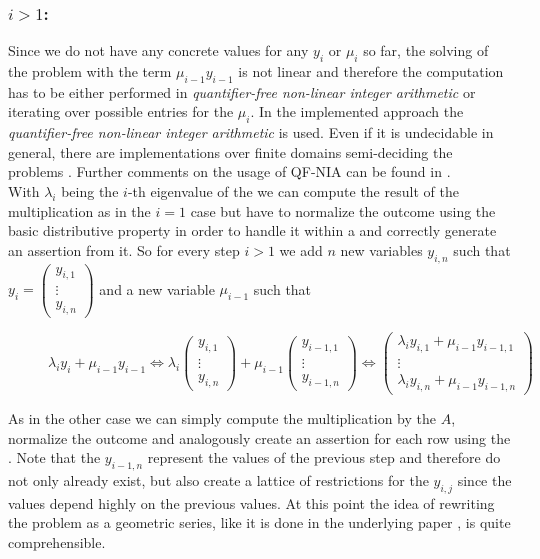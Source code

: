 \subsubsection{$i > 1$:}
Since we do not have any concrete values for any $y_i$ or $\mu_i$ so far, the solving of the problem with the term $\mu_{i-1}y_{i-1}$ is not linear and therefore the computation has to be either performed in \textit{quantifier-free non-linear integer arithmetic} or iterating over possible entries for the $\mu_i$.\newline
In the implemented approach the \textit{quantifier-free non-linear integer arithmetic} is used. Even if it is undecidable in general, there are implementations over finite domains semi-deciding the problems  \cite{behrmann2014bit} \cite{giesl2016}. Further comments on the usage of QF-NIA can be found in .
\\
With $\lambda_i$ being the $i$-th eigenvalue of the \updatematrix we can compute the result of the multiplication as in the $i=1$ case but have to normalize the outcome using the basic distributive property in order to handle it within a \rpntree and correctly generate an assertion from it.\newline
So for every step $i > 1$ we add $n$ new variables $y_{i,n}$ such that $y_i = \begin{pmatrix} y_{i,1} \\ \vdots \\ y_{i,n}\end{pmatrix}$ and a new variable $\mu_{i-1}$ such that 
\begin{figure}[H]
	\centering
	$\lambda_i y_i+\mu_{i-1}y_{i-1} \Leftrightarrow \lambda_i \begin{pmatrix} y_{i,1} \\ \vdots \\ y_{i,n}\end{pmatrix} + \mu_{i-1} \begin{pmatrix} y_{i-1,1} \\ \vdots \\ y_{i-1,n}\end{pmatrix} \Leftrightarrow \begin{pmatrix}
		\lambda_i y_{i,1}+\mu_{i-1}y_{i-1,1} \\ \vdots \\ \lambda_i y_{i,n}+\mu_{i-1}y_{i-1,n}
	\end{pmatrix}$ 
\end{figure}

As in the other case we can simply compute the multiplication by the \updatematrix $A$, normalize the outcome and analogously create an assertion for each row using the \smtfactory. \newline
Note that the $y_{i-1,n}$ represent the values of the previous step and therefore do not only already exist, but also create a lattice of restrictions for the $y_{i,j}$ since the values depend highly on the previous values. At this point the idea of rewriting the problem as a geometric series, like it is done in the underlying paper \cite{leike2014geometric}, is quite comprehensible.

